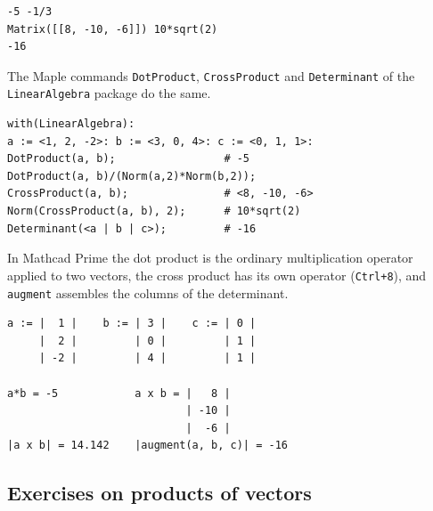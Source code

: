 \begin{Verbatim}[fontsize=\footnotesize,frame=single,label={\small Output}]
-5 -1/3
Matrix([[8, -10, -6]]) 10*sqrt(2)
-16
\end{Verbatim}

The Maple commands \texttt{DotProduct}, \texttt{CrossProduct} and
\texttt{Determinant} of the \texttt{LinearAlgebra} package do the same.

\begin{Verbatim}[fontsize=\footnotesize,frame=single,label={\small Maple}]
with(LinearAlgebra):
a := <1, 2, -2>: b := <3, 0, 4>: c := <0, 1, 1>:
DotProduct(a, b);                 # -5
DotProduct(a, b)/(Norm(a,2)*Norm(b,2));
CrossProduct(a, b);               # <8, -10, -6>
Norm(CrossProduct(a, b), 2);      # 10*sqrt(2)
Determinant(<a | b | c>);         # -16
\end{Verbatim}

In Mathcad Prime the dot product is the ordinary multiplication operator
applied to two vectors, the cross product has its own operator
(\texttt{Ctrl+8}), and \texttt{augment} assembles the columns of the
determinant.

\begin{Verbatim}[fontsize=\footnotesize,frame=single,label={\small Mathcad}]
a := |  1 |    b := | 3 |    c := | 0 |
     |  2 |         | 0 |         | 1 |
     | -2 |         | 4 |         | 1 |

a*b = -5            a x b = |   8 |
                            | -10 |
                            |  -6 |
|a x b| = 14.142    |augment(a, b, c)| = -16
\end{Verbatim}

\subsection{Exercises on products of vectors}

